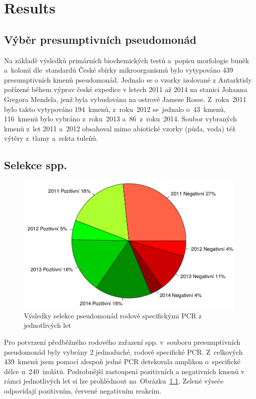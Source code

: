 \chapter{Results}

\shorthandoff{-} 

\section{Výběr presumptivních pseudomonád}
Na základě výsledků primárních biochemických testů a~popisu morfologie buněk a~kolonií dle~standardů České sbírky mikroorganismů bylo vytypováno 439 presumptivních kmenů pseudomonád.
Jednalo se o vzorky izolované z Antarktidy pořízené během výprav české expedice v letech 2011 až 2014 na stanici Johanna Gregora Mendela, jenž byla vybudována na ostrově Jamese Rosse.
Z~roku~2011 bylo takto vytypováno 194~kmenů, z~roku~2012 se~jednalo o~43~kmenů, 116~kmenů bylo vybráno z~roku~2013 a~86~z~roku~2014.
Soubor vybraných kmenů z~let 2011 a~2012 obsahoval mimo abiotické vzorky (půda, voda) též výtěry z~tlamy a~rekta tuleňů.

\section{Selekce  spp.}
\begin{figure}[h!!!]
  \centering
  \includegraphics[scale=0.31]{text/Pictures/Graf_PCR_Poz-Neg.png}
	\caption{Výsledky selekce pseudomonád rodově specifickými PCR z jednotlivých let}
	\label{PCR_P-N}
\end{figure}
Pro potvrzení předběžného rodového zařazení  spp. v~souboru presumptivních pseudomonád byly vybrány 2 jednoduché, rodově specifické PCR.
Z~celkových 439~kmenů jsem pomocí alespoň jedné PCR detekovala amplikon o~specifické délce u~240~izolátů.
Podrobnější zastoupení pozitivních a negativních kmenů v rámci jednotlivých let si lze prohlédnout na~Obrázku~\ref{PCR_P-N}.
Zelené výseče odpovídají pozitivním, červené negativním reakcím.

